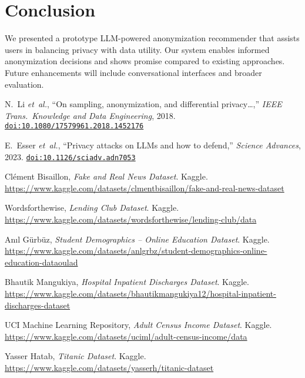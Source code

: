 \documentclass{article}
\begin{document}
\section{Conclusion}
We presented a prototype LLM-powered anonymization recommender that assists users in balancing privacy with data utility. Our system enables informed anonymization decisions and shows promise compared to existing approaches. Future enhancements will include conversational interfaces and broader evaluation.


\begin{thebibliography}{9}

N.~Li \emph{et~al.},
“On sampling, anonymization, and differential privacy…,”
\emph{IEEE Trans.\ Knowledge and Data Engineering}, 2018.
\href{https://www.tandfonline.com/doi/full/10.1080/17579961.2018.1452176#abstract}{%
\texttt{doi:10.1080/17579961.2018.1452176}
}

E.~Esser \emph{et~al.},
“Privacy attacks on LLMs and how to defend,”
\emph{Science Advances}, 2023.
\href{https://www.science.org/doi/full/10.1126/sciadv.adn7053}{%
\texttt{doi:10.1126/sciadv.adn7053}
}

Clément Bisaillon, 
\emph{Fake and Real News Dataset}. Kaggle. 
\href{https://www.kaggle.com/datasets/clmentbisaillon/fake-and-real-news-dataset}{https://www.kaggle.com/datasets/clmentbisaillon/fake-and-real-news-dataset}

Wordsforthewise, 
\emph{Lending Club Dataset}. Kaggle. 
\href{https://www.kaggle.com/datasets/wordsforthewise/lending-club/data}{https://www.kaggle.com/datasets/wordsforthewise/lending-club/data}

Anıl Gürbüz, 
\emph{Student Demographics – Online Education Dataset}. Kaggle. 
\href{https://www.kaggle.com/datasets/anlgrbz/student-demographics-online-education-dataoulad}{https://www.kaggle.com/datasets/anlgrbz/student-demographics-online-education-dataoulad}

Bhautik Mangukiya, 
\emph{Hospital Inpatient Discharges Dataset}. Kaggle. 
\href{https://www.kaggle.com/datasets/bhautikmangukiya12/hospital-inpatient-discharges-dataset}{https://www.kaggle.com/datasets/bhautikmangukiya12/hospital-inpatient-discharges-dataset}

UCI Machine Learning Repository, 
\emph{Adult Census Income Dataset}. Kaggle. 
\href{https://www.kaggle.com/datasets/uciml/adult-census-income/data}{https://www.kaggle.com/datasets/uciml/adult-census-income/data}

Yasser Hatab, 
\emph{Titanic Dataset}. Kaggle. 
\href{https://www.kaggle.com/datasets/yasserh/titanic-dataset}{https://www.kaggle.com/datasets/yasserh/titanic-dataset}


\end{thebibliography}
\end{document}
